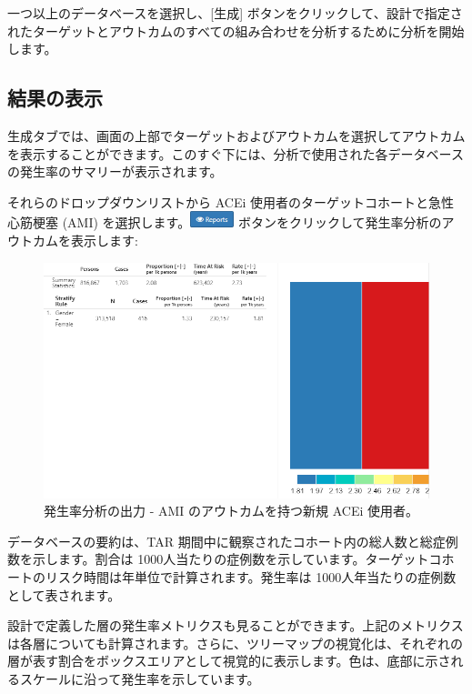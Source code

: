 \documentclass[
  11pt]{book}
\theoremstyle{definition}
\theoremstyle{definition}
\theoremstyle{definition}
\theoremstyle{definition}
\theoremstyle{remark}
\begin{document}
一つ以上のデータベースを選択し、{[}生成{]} ボタンをクリックして、設計で指定されたターゲットとアウトカムのすべての組み合わせを分析するために分析を開始します。

\subsection{結果の表示}\label{ux7d50ux679cux306eux8868ux793a-1}

生成タブでは、画面の上部でターゲットおよびアウトカムを選択してアウトカムを表示することができます。このすぐ下には、分析で使用された各データベースの発生率のサマリーが表示されます。

それらのドロップダウンリストから ACEi 使用者のターゲットコホートと急性心筋梗塞 (AMI) を選択します。\includegraphics{images/Characterization/atlasIncidenceReportButton.png} ボタンをクリックして発生率分析のアウトカムを表示します:

\begin{figure}

{\centering \includegraphics[width=1\linewidth]{images/Characterization/atlasIncidenceResults} 

}

\caption{発生率分析の出力 - AMI のアウトカムを持つ新規 ACEi 使用者。}\label{fig:atlasIncidenceResults}
\end{figure}

データベースの要約は、TAR 期間中に観察されたコホート内の総人数と総症例数を示します。割合は 1000人当たりの症例数を示しています。ターゲットコホートのリスク時間は年単位で計算されます。発生率は 1000人年当たりの症例数として表されます。

設計で定義した層の発生率メトリクスも見ることができます。上記のメトリクスは各層についても計算されます。さらに、ツリーマップの視覚化は、それぞれの層が表す割合をボックスエリアとして視覚的に表示します。色は、底部に示されるスケールに沿って発生率を示しています。
\end{document}
